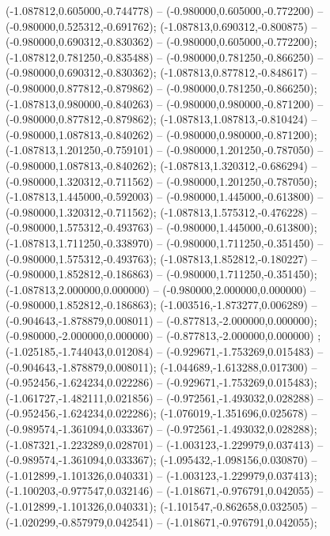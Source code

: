  (-1.087812,0.605000,-0.744778) -- (-0.980000,0.605000,-0.772200) -- (-0.980000,0.525312,-0.691762);
 (-1.087813,0.690312,-0.800875) -- (-0.980000,0.690312,-0.830362) -- (-0.980000,0.605000,-0.772200);
 (-1.087812,0.781250,-0.835488) -- (-0.980000,0.781250,-0.866250) -- (-0.980000,0.690312,-0.830362);
 (-1.087813,0.877812,-0.848617) -- (-0.980000,0.877812,-0.879862) -- (-0.980000,0.781250,-0.866250);
 (-1.087813,0.980000,-0.840263) -- (-0.980000,0.980000,-0.871200) -- (-0.980000,0.877812,-0.879862);
 (-1.087813,1.087813,-0.810424) -- (-0.980000,1.087813,-0.840262) -- (-0.980000,0.980000,-0.871200);
 (-1.087813,1.201250,-0.759101) -- (-0.980000,1.201250,-0.787050) -- (-0.980000,1.087813,-0.840262);
 (-1.087813,1.320312,-0.686294) -- (-0.980000,1.320312,-0.711562) -- (-0.980000,1.201250,-0.787050);
 (-1.087813,1.445000,-0.592003) -- (-0.980000,1.445000,-0.613800) -- (-0.980000,1.320312,-0.711562);
 (-1.087813,1.575312,-0.476228) -- (-0.980000,1.575312,-0.493763) -- (-0.980000,1.445000,-0.613800);
 (-1.087813,1.711250,-0.338970) -- (-0.980000,1.711250,-0.351450) -- (-0.980000,1.575312,-0.493763);
 (-1.087813,1.852812,-0.180227) -- (-0.980000,1.852812,-0.186863) -- (-0.980000,1.711250,-0.351450);
 (-1.087813,2.000000,0.000000) -- (-0.980000,2.000000,0.000000) -- (-0.980000,1.852812,-0.186863);
 (-1.003516,-1.873277,0.006289) -- (-0.904643,-1.878879,0.008011) -- (-0.877813,-2.000000,0.000000);
 (-0.980000,-2.000000,0.000000) -- (-0.877813,-2.000000,0.000000) ;
 (-1.025185,-1.744043,0.012084) -- (-0.929671,-1.753269,0.015483) -- (-0.904643,-1.878879,0.008011);
 (-1.044689,-1.613288,0.017300) -- (-0.952456,-1.624234,0.022286) -- (-0.929671,-1.753269,0.015483);
 (-1.061727,-1.482111,0.021856) -- (-0.972561,-1.493032,0.028288) -- (-0.952456,-1.624234,0.022286);
 (-1.076019,-1.351696,0.025678) -- (-0.989574,-1.361094,0.033367) -- (-0.972561,-1.493032,0.028288);
 (-1.087321,-1.223289,0.028701) -- (-1.003123,-1.229979,0.037413) -- (-0.989574,-1.361094,0.033367);
 (-1.095432,-1.098156,0.030870) -- (-1.012899,-1.101326,0.040331) -- (-1.003123,-1.229979,0.037413);
 (-1.100203,-0.977547,0.032146) -- (-1.018671,-0.976791,0.042055) -- (-1.012899,-1.101326,0.040331);
 (-1.101547,-0.862658,0.032505) -- (-1.020299,-0.857979,0.042541) -- (-1.018671,-0.976791,0.042055);
